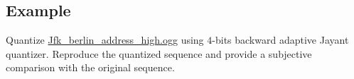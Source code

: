 \subsection{Example}
Quantize
\href{https://upload.wikimedia.org/wikipedia/commons/3/3a/Jfk_berlin_address_high.ogg}{Jfk\_berlin\_address\_high.ogg}
using \(4\)-bits backward adaptive Jayant quantizer. Reproduce the
quantized sequence and provide a subjective comparison with the original
sequence.


